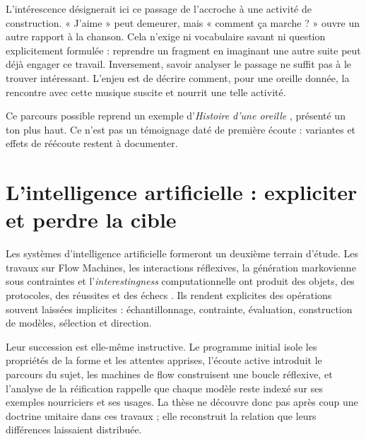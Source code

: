 \documentclass[11pt,a4paper]{article}
\begin{document}
L'intérescence désignerait ici ce passage de l'accroche à une activité de
construction. « J'aime » peut demeurer, mais « comment ça marche ? » ouvre un autre
rapport à la chanson. Cela n'exige ni vocabulaire savant ni question explicitement
formulée : reprendre un fragment en imaginant une autre suite peut déjà engager ce
travail. Inversement, savoir analyser le passage ne suffit pas à le trouver
intéressant. L'enjeu est de décrire comment, pour une oreille donnée, la rencontre
avec cette musique suscite et nourrit une telle activité.

Ce parcours possible reprend un exemple d'\emph{Histoire d'une oreille}
\parencite[119--120]{pachet2018oreille}, présenté un ton plus haut.
Ce n'est pas un témoignage daté de première écoute : variantes et effets de
réécoute restent à documenter.

\section{L'intelligence artificielle : expliciter et perdre la cible}

Les systèmes d'intelligence artificielle formeront un deuxième terrain d'étude.
Les travaux sur Flow Machines, les interactions réflexives, la génération
markovienne sous contraintes et l'\emph{interestingness} computationnelle ont
produit des objets, des protocoles, des réussites et des échecs
\parencite{pachet1999surprising,pachet1999active,pachet1999programs,pachet2000melodie,
pachet2002continuatorinteraction,pachet2004flowmachines,pachet2004reification,
pachet2004cybernetic,pachet2004childrenreflect,addessi2005experiments,
pachet2006clefs,pachet2006creativity,pachet2006reflective,pachet2008machines,
jones2009stimulating,pachet2006interactionsreflexives,addessi2006flowmachine,
aucouturier2002similarity,pachetroy2008hitsong,pachet2011hitsong,
lerch2011closedloop,
milipachet1995regularity,pachet2012virtuosity,martin2016creativeprocess,
pachet2021assisted,pachet2026markov}.
Ils rendent explicites des opérations souvent laissées implicites :
échantillonnage, contrainte, évaluation, construction de modèles, sélection et
direction.

Leur succession est elle-même instructive. Le programme initial isole les
propriétés de la forme et les attentes apprises, l'écoute active introduit le
parcours du sujet, les machines de flow construisent une boucle réflexive, et
l'analyse de la réification rappelle que chaque modèle reste indexé sur ses
exemples nourriciers et ses usages. La thèse ne découvre donc pas après coup une
doctrine unitaire dans ces travaux ; elle reconstruit la relation que leurs
différences laissaient distribuée.
\end{document}

